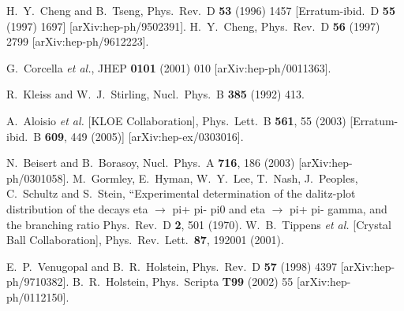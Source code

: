 \documentclass{article}
\begin{document}
\begin{thebibliography}{99}
  H.~Y.~Cheng and B.~Tseng,
  Phys.\ Rev.\  D {\bf 53} (1996) 1457
  [Erratum-ibid.\  D {\bf 55} (1997) 1697]
  [arXiv:hep-ph/9502391].
  H.~Y.~Cheng,
  Phys.\ Rev.\  D {\bf 56} (1997) 2799
  [arXiv:hep-ph/9612223].

  G.~Corcella {\it et al.},
  JHEP {\bf 0101} (2001) 010
  [arXiv:hep-ph/0011363].

 R.~Kleiss and W.~J.~Stirling,
Nucl.\ Phys.\  B {\bf 385} (1992) 413.

  A.~Aloisio {\it et al.}  [KLOE Collaboration],
  Phys.\ Lett.\  B {\bf 561}, 55 (2003)
  [Erratum-ibid.\  B {\bf 609}, 449 (2005)]
  [arXiv:hep-ex/0303016].

  N.~Beisert and B.~Borasoy,
  Nucl.\ Phys.\  A {\bf 716}, 186 (2003)
  [arXiv:hep-ph/0301058].
  M.~Gormley, E.~Hyman, W.~Y.~Lee, T.~Nash, J.~Peoples, C.~Schultz and S.~Stein,
   ``Experimental determination of the dalitz-plot distribution of the decays
   eta $\to$ pi+ pi- pi0 and eta $\to$ pi+ pi- gamma, and the branching ratio
  Phys.\ Rev.\  D {\bf 2}, 501 (1970).
  W.~B.~Tippens {\it et al.}  [Crystal Ball Collaboration],
  Phys.\ Rev.\ Lett.\  {\bf 87}, 192001 (2001).

 E.~P.~Venugopal and B.~R.~Holstein,
Phys.\ Rev.\  D {\bf 57} (1998) 4397 [arXiv:hep-ph/9710382].
 B.~R.~Holstein,
 Phys.\ Scripta {\bf T99} (2002) 55 [arXiv:hep-ph/0112150].


\end{thebibliography}
\end{document}
